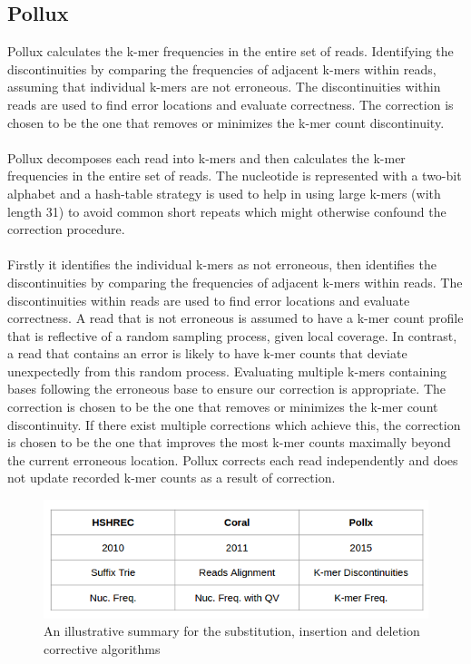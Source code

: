 \documentclass[12pt]{llncs}
\begin{document}
\subsection{Pollux}
Pollux \cite{Pollux} calculates the k-mer frequencies in the entire set of reads. Identifying the discontinuities by comparing the frequencies of adjacent k-mers within reads, assuming that individual k-mers are not erroneous. The discontinuities within reads are used to find error locations and evaluate correctness. The correction is chosen to be the one that removes or minimizes the k-mer count discontinuity.
\\
\\
Pollux decomposes each read into k-mers and then calculates the k-mer frequencies in the entire set of reads. The nucleotide is represented with a two-bit alphabet and a hash-table strategy is used to help in using large k-mers (with length 31) to avoid common short repeats which might otherwise confound the correction procedure.
\\
\\
Firstly it identifies the individual k-mers as not erroneous, then identifies the discontinuities by comparing the frequencies of adjacent k-mers within reads. The discontinuities within reads are used to find error locations and evaluate correctness. A read that is not erroneous is assumed to have a k-mer count profile that is reflective of a random sampling process, given local coverage. In contrast, a read that contains an error is likely to have k-mer counts that deviate unexpectedly from this random process. Evaluating multiple k-mers containing bases following the erroneous base to ensure our correction is appropriate. The correction is chosen to be the one that removes or minimizes the k-mer count discontinuity. If there exist multiple corrections which achieve this, the correction is chosen to be the one that improves the most k-mer counts maximally beyond the current erroneous location. Pollux corrects each read independently and does not update recorded k-mer counts as a result of correction.
 
\begin{figure}
	\centering
	\includegraphics[width=.911\linewidth]{./figs/RW-2}
	\caption{\label{fig:fig-RW-2}An illustrative summary for the substitution, insertion and deletion corrective algorithms}
\end{figure}
\end{document}
